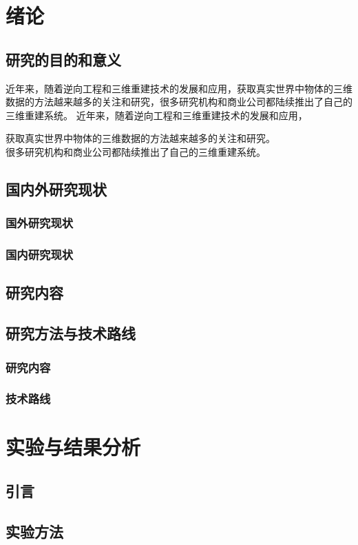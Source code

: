 \documentclass[12pt]{ctexbook}  %
\begin{document}
	\chapter{绪论}
	\section{研究的目的和意义}
	
	近年来，随着逆向工程和三维重建技术的发展和应用，获取真实世界中物体的三维数据的方法越来越多的关注和研究，很多研究机构和商业公司都陆续推出了自己的三维重建系统。
	近年来，随着逆向工程和三维重建技术的发展和应用，\par 获取真实世界中物体的三维数据的方法越来越多的关注和研究。\\很多研究机构和商业公司都陆续推出了自己的三维重建系统。
	\section{国内外研究现状}
	\subsection{国外研究现状}
	\subsection{国内研究现状}
	\section{研究内容}
	\section{研究方法与技术路线}
	\subsection{研究内容}
	\subsection{技术路线}
	
	\chapter{实验与结果分析}
	\section{引言}
	\section{实验方法}
\end{document}
